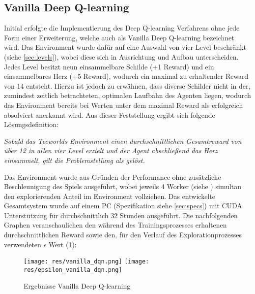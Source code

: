 \documentclass[11pt]{scrartcl}
\begin{document}

\subsection{Vanilla Deep Q-learning}
Initial erfolgte die Implementierung des Deep Q-learning Verfahrens ohne jede Form einer Erweiterung,
welche auch als Vanilla Deep Q-learning bezeichnet wird. Das Environment wurde dafür auf eine Auswahl
von vier Level beschränkt (siehe \autoref{sec:levels}), wobei diese sich in Ausrichtung und Aufbau
unterscheiden. Jedes Level besitzt neun einsammelbare Schilde (+1 Reward) und ein einsammelbares
Herz (+5 Reward), wodurch ein maximal zu erhaltender Reward von 14 entsteht. Hierzu ist jedoch zu
erwähnen, dass diverse Schilder nicht in der, zumindest zeitlich betrachteten, optimalen Laufbahn
des Agenten liegen, wodurch das Environment bereits bei Werten unter dem maximal Reward als
erfolgreich absolviert anerkannt wird. Aus dieser Feststellung ergibt sich folgende
Lösungsdefinition:

\textit{Sobald das Teeworlds Environment einen durchschnittlichen Gesamtreward von über 12 in allen
vier Level erzielt und der Agent abschließend das Herz einsammelt, gilt die Problemstellung als 
gelöst.}

Das Environment wurde aus Gründen der Performance ohne zusätzliche Beschleunigung des Spiels
ausgeführt, wobei jeweils 4 Worker (siehe ) simultan den
explorierenden Anteil im Environment vollziehen. Das entwickelte Gesamtsystem wurde auf einem
PC (Spezifikation siehe \autoref{sec:specs}) mit CUDA Unterstützung für durchschnittlich 32 
Stunden ausgeführt. Die nachfolgenden Graphen %
veranschaulichen den während des Trainingsprozesses erhaltenen durchschnittlichen Reward sowie
den, für den Verlauf des Explorationprozesses verwendeten $\epsilon$ Wert (\ref{fig:vanilla-dqn}):

\begin{figure}[htp]
\centering
\texttt{[image: res/vanilla\_dqn.png]}
\texttt{[image: res/epsilon\_vanilla\_dqn.png]}
\caption{Ergebnisse Vanilla Deep Q-learning}
\label{fig:vanilla-dqn}
\end{figure}
\end{document}
